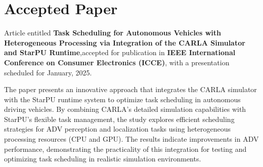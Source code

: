 

\chapter{Accepted Paper}
\label{anexo-accepted}
\vspace{-1.9cm}

Article entitled \textbf{Task Scheduling for Autonomous Vehicles with Heterogeneous Processing via Integration of the CARLA Simulator and StarPU Runtime},accepted for publication in \textbf{IEEE International Conference on Consumer Electronics (ICCE)}, with a presentation scheduled for January, 2025.

The paper presents an innovative approach that integrates the CARLA simulator with the StarPU runtime system to optimize task scheduling in autonomous driving vehicles. By combining CARLA's detailed simulation capabilities with StarPU's flexible task management, the study explores efficient scheduling strategies for ADV perception and localization tasks using heterogeneous processing resources (CPU and GPU). The results indicate improvements in ADV performance, demonstrating the practicality of this integration for testing and optimizing task scheduling in realistic simulation environments.




